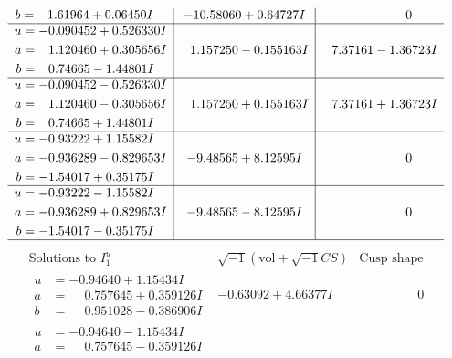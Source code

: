 \documentclass[1p]{elsarticle_modified}
\theoremstyle{definition}
\newcommand{\I}{\sqrt{-1}}
\begin{document}
$$\begin{array}{c|c|c}
\begin{aligned}
b &= \phantom{-}1.61964 + 0.06450 I\end{aligned}
 & -10.58060 + 0.64727 I & \phantom{-0.000000 } 0 \\ \hline\begin{aligned}
u &= -0.090452 + 0.526330 I \\
a &= \phantom{-}1.120460 + 0.305656 I \\
b &= \phantom{-}0.74665 - 1.44801 I\end{aligned}
 & \phantom{-}1.157250 - 0.155163 I & \phantom{-}7.37161 - 1.36723 I \\ \hline\begin{aligned}
u &= -0.090452 - 0.526330 I \\
a &= \phantom{-}1.120460 - 0.305656 I \\
b &= \phantom{-}0.74665 + 1.44801 I\end{aligned}
 & \phantom{-}1.157250 + 0.155163 I & \phantom{-}7.37161 + 1.36723 I \\ \hline\begin{aligned}
u &= -0.93222 + 1.15582 I \\
a &= -0.936289 - 0.829653 I \\
b &= -1.54017 + 0.35175 I\end{aligned}
 & -9.48565 + 8.12595 I & \phantom{-0.000000 } 0 \\ \hline\begin{aligned}
u &= -0.93222 - 1.15582 I \\
a &= -0.936289 + 0.829653 I \\
b &= -1.54017 - 0.35175 I\end{aligned}
 & -9.48565 - 8.12595 I & \phantom{-0.000000 } 0\\
 \hline 
 \end{array}$$\newpage$$\begin{array}{c|c|c}  
\text{Solutions to }I^u_{1}& \I (\text{vol} + \sqrt{-1}CS) & \text{Cusp shape}\\
 \hline 
\begin{aligned}
u &= -0.94640 + 1.15434 I \\
a &= \phantom{-}0.757645 + 0.359126 I \\
b &= \phantom{-}0.951028 - 0.386906 I\end{aligned}
 & -0.63092 + 4.66377 I & \phantom{-0.000000 } 0 \\ \hline\begin{aligned}
u &= -0.94640 - 1.15434 I \\
a &= \phantom{-}0.757645 - 0.359126 I \\

\end{aligned}
\end{array}$$
\end{document}
